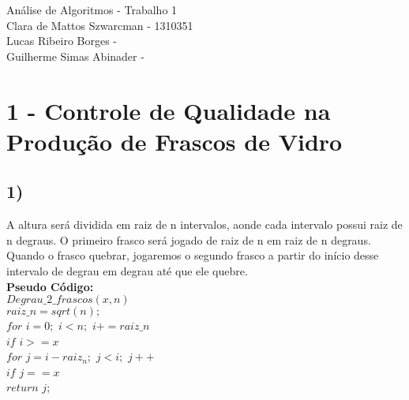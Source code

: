 \documentclass[10pt,a4paper]{article}
\begin{document}
\begin{flushleft}

	\large{Análise de Algoritmos - Trabalho 1}\\
	Clara de Mattos Szwarcman - 1310351\\
	Lucas Ribeiro Borges - \\
	Guilherme Simas Abinader -\\ 

\end{flushleft}


	\section*{1 - Controle de Qualidade na Produção de Frascos de Vidro}
	
		\vspace{1cm}
	
		\subsection*{1)}
		
		\tab A altura será dividida em raiz de n intervalos, aonde cada intervalo possui raiz de n degraus. O primeiro frasco será jogado de raiz de n em raiz de n degraus. Quando o frasco quebrar, jogaremos o segundo frasco a partir do início desse intervalo de degrau em degrau até que ele quebre.\\
		
		\textbf{Pseudo Código: }\\
		
		$Degrau\_2\_frascos(x,n)$\\

		\hspace{1cm} $raiz\_n = sqrt(n);$\\


		\hspace{1cm} $for$  $i = 0;$ $i < n;$ $i+=raiz\_n$\\

		\hspace{2cm} $if$ $i >= x$\\

		\hspace{3cm} $for$ $j = i-raiz_n;$ $j < i;$ $j++$\\

		\hspace{4cm} $if$ $j == x$\\

		\hspace{5cm} $return$ $j;$\\
\end{document}
